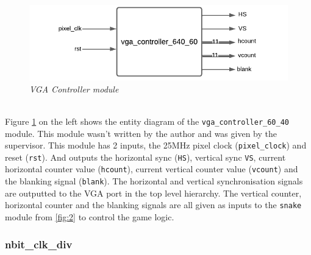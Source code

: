 \documentclass[aps, secnumarabic, balancelastpage, asmath, amssymb, nofootinbib, floatfix,]{revtex4-2}
\begin{document}
{\vspace{-1.5em}
\begin{figure}
    \centering
    \includegraphics[scale = 0.8]{vga_controller.pdf}
    \caption{\em VGA Controller module}
    \label{fig:13}
\end{figure}
~\\
Figure \ref{fig:13} on the left shows the entity diagram of the \verb|vga_controller_60_40| module. This module wasn't written by the author and was given by the supervisor. This module has 2 inputs, the 25MHz pixel clock (\verb|pixel_clock|) and reset (\verb|rst|). And outputs the horizontal sync (\verb|HS|), vertical sync \verb|VS|, current horizontal counter value (\verb|hcount|), current vertical counter value (\verb|vcount|) and the blanking signal (\verb|blank|). The horizontal and vertical synchronisation signals are outputted to the VGA port in the top level hierarchy. The vertical counter, horizontal counter and the blanking signals are all given as inputs to the \verb|snake| module from \ref{fig:2} to control the game logic.

\vspace{-1em}
\subsubsection{\fontsize{10pt}{12pt}\selectfont \bf nbit\_clk\_div \label{sec:2.2.7}}









}
\end{document}
